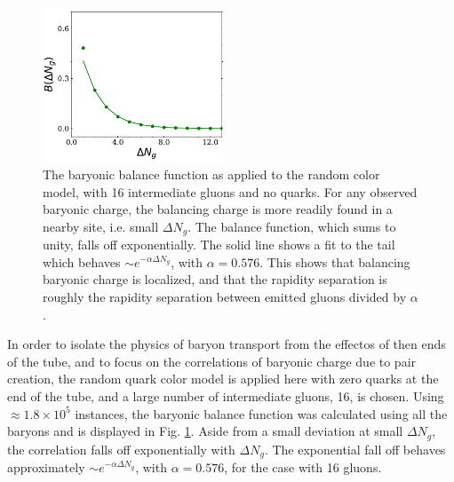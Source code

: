 \documentclass[aps, prc, 12pt, nofootinbib, showpacs, superscriptaddress, tightenlines, groupedaddress]{revtex4-2}
\begin{document}
\begin{figure}
\centerline{\includegraphics[width=0.48\textwidth]{figs/bcorr.pdf}}
\caption{\label{fig:bcorr}
The baryonic balance function as applied to the random color model, with 16 intermediate gluons and no quarks. For any observed baryonic charge, the balancing charge is more readily found in a nearby site, i.e. small $\Delta N_g$. The balance function, which sums to unity, falls off exponentially. The solid line shows a fit to the tail which behaves $\sim e^{-\alpha\Delta N_g}$, with $\alpha=0.576$. This shows that balancing baryonic charge is localized, and that the rapidity separation is roughly the rapidity separation between emitted gluons divided by $\alpha$.
}
\end{figure}
In order to isolate the physics of baryon transport from the effectos of then ends of the tube, and to focus on the correlations of baryonic charge due to pair creation, the random quark color model is applied here with zero quarks at the end of the tube, and a large number of intermediate gluons, 16, is chosen. Using $\approx 1.8\times 10^5$ instances, the baryonic balance function was calculated using all the baryons and is displayed in Fig. \ref{fig:bcorr}. Aside from a small deviation at small $\Delta N_g$, the correlation falls off exponentially with $\Delta N_g$. The exponential fall off behaves approximately $\sim e^{-\alpha \Delta N_g}$, with $\alpha=0.576$, for the case with 16 gluons.
\end{document}
